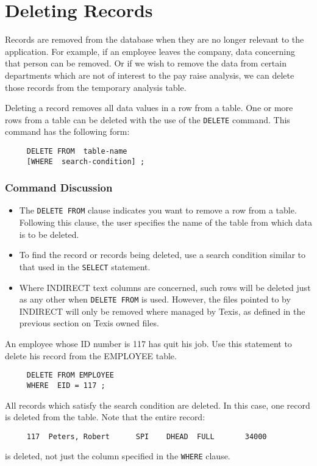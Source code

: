 \section{Deleting Records}

Records are removed from the database when they are no longer relevant
to the application.  For example, if an employee leaves the company,
data concerning that person can be removed.  Or if we wish to remove
the data from certain departments which are not of interest to the pay
raise analysis, we can delete those records from the temporary
analysis table.

Deleting a record removes all data values in a row from a table.  One
or more rows from a table can be deleted with the use of the \verb`DELETE`
command.  This command has the following form:
\begin{verbatim}
     DELETE FROM  table-name
     [WHERE  search-condition] ;
\end{verbatim}

\subsubsection{Command Discussion}

\begin{itemize}
\item The {\tt DELETE FROM} clause indicates you want to remove a row from a
table.  Following this clause, the user specifies the name of the
table from which data is to be deleted.

\item To find the record or records being deleted, use a search
condition similar to that used in the \verb`SELECT` statement.

\item Where INDIRECT text columns are concerned, such rows will be
deleted just as any other when {\tt DELETE FROM} is used.  However, the
files pointed to by INDIRECT will only be removed where managed by
Texis, as defined in the previous section on Texis owned files.
\end{itemize}

An employee whose ID number is 117 has quit his job.  Use this
statement to delete his record from the EMPLOYEE table.

\begin{verbatim}
     DELETE FROM EMPLOYEE
     WHERE  EID = 117 ;
\end{verbatim}

All records which satisfy the search condition are deleted.  In this
case, one record is deleted from the table.  Note that the entire
record:
\begin{verbatim}
     117  Peters, Robert      SPI    DHEAD  FULL       34000
\end{verbatim}
is deleted, not just the column specified in the \verb`WHERE` clause.

